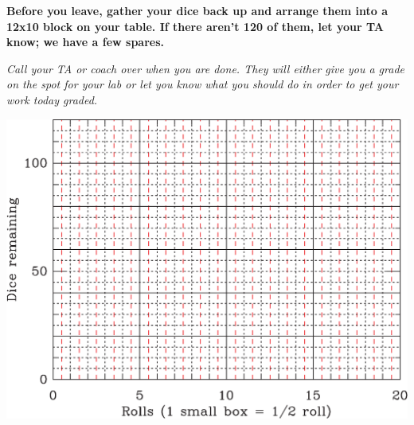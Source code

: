 \documentclass[11pt]{article}
\begin{document}
\vspace{1cm}

{\bf Before you leave, gather your dice back up and arrange them into a 12x10 block on your table. If there aren't 120 of them, let your TA know; we have a few spares.}

{\it Call your TA or coach over when you are done. They will either give you a grade on the spot for your lab or let you know what you should do in order to get your work today graded.}

\newpage

\includegraphics[height=\textwidth,angle=90,origin=c]{graphpaper-crop.pdf}
\end{document}
